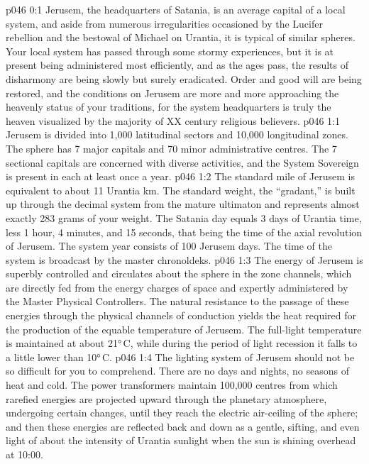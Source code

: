 \author{Archangel}
\vs p046 0:1 Jerusem, the headquarters of Satania, is an average capital of a local system, and aside from numerous irregularities occasioned by the Lucifer rebellion and the bestowal of Michael on Urantia, it is typical of similar spheres. Your local system has passed through some stormy experiences, but it is at present being administered most efficiently, and as the ages pass, the results of disharmony are being slowly but surely eradicated. Order and good will are being restored, and the conditions on Jerusem are more and more approaching the heavenly status of your traditions, for the system headquarters is truly the heaven visualized by the majority of XX century religious believers.
\vs p046 1:1 Jerusem is divided into 1,000 latitudinal sectors and 10,000 longitudinal zones. The sphere has 7 major capitals and 70 minor administrative centres. The 7 sectional capitals are concerned with diverse activities, and the System Sovereign is present in each at least once a year.
\vs p046 1:2 \pc The standard mile of Jerusem is equivalent to about 11 Urantia km. The standard weight, the “gradant,” is built up through the decimal system from the mature ultimaton and represents almost exactly 283 grams of your weight. The Satania day equals 3 days of Urantia time, less 1 hour, 4 minutes, and 15 seconds, that being the time of the axial revolution of Jerusem. The system year consists of 100 Jerusem days. The time of the system is broadcast by the master chronoldeks.
\vs p046 1:3 \pc The energy of Jerusem is superbly controlled and circulates about the sphere in the zone channels, which are directly fed from the energy charges of space and expertly administered by the Master Physical Controllers. The natural resistance to the passage of these energies through the physical channels of conduction yields the heat required for the production of the equable temperature of Jerusem. The full\hyp{}light temperature is maintained at about 21°\,C, while during the period of light recession it falls to a little lower than 10°\,C.
\vs p046 1:4 \pc The lighting system of Jerusem should not be so difficult for you to comprehend. There are no days and nights, no seasons of heat and cold. The power transformers maintain 100,000 centres from which rarefied energies are projected upward through the planetary atmosphere, undergoing certain changes, until they reach the electric air\hyp{}ceiling of the sphere; and then these energies are reflected back and down as a gentle, sifting, and even light of about the intensity of Urantia sunlight when the sun is shining overhead at 10:00.
